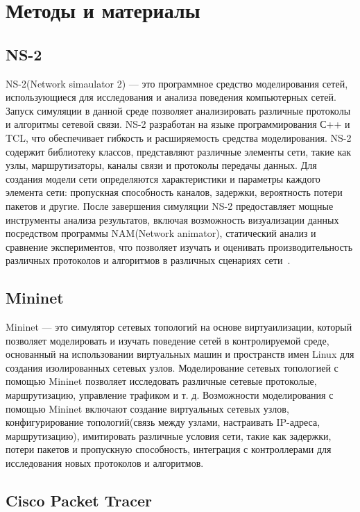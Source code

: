 \chapter{Методы и материалы}
\section{NS-2}
NS-2(Network simaulator 2) — это программное средство моделирования сетей, использующиеся 
для исследования и анализа поведения компьютерных сетей. 
Запуск симуляции в данной среде позволяет анализировать различные протоколы и алгоритмы сетевой связи. 
NS-2 разработан на языке программирования С++ и TCL, что обеспечивает гибкость и расширяемость средства моделирования. 
NS-2 содержит библиотеку классов, представляют различные элементы сети, такие как узлы, маршрутизаторы, каналы связи и протоколы передачы данных. Для создания модели сети определяются характеристики и параметры каждого элемента сети: пропускная способность каналов, задержки, вероятность потери пакетов и другие. После завершения симуляции NS-2 предоставляет мощные инструменты анализа результатов, включая возможность визуализации данных посредством программы NAM(Network animator), статический анализ и сравнение экспериментов, что позволяет изучать и оценивать производительность различных протоколов и алгоритмов в различных сценариях сети~\cite{NS1,NS2}.

\section{Mininet}

Mininet — это симулятор сетевых топологий на основе виртуаилизации, который позволяет моделировать и изучать поведение сетей в контролируемой среде, основанный на использовании виртуальных машин и пространств имен Linux для создания изолированных сетевых узлов. Моделирование сетевых топологией с помощью Mininet позволяет исследовать различные сетевые протоколые, маршрутизацию, управление трафиком и т. д. Возможности моделирования с помощью Mininet включают создание виртуальных сетевых узлов, конфигурирование топологий(связь между узлами, настраивать IP-адреса, маршрутизацию), имитировать различные условия сети, такие как задержки, потери пакетов и пропускную способность, интеграция с контроллерами для исследования новых протоколов и алгоритмов.

\section{Cisco Packet Tracer}

